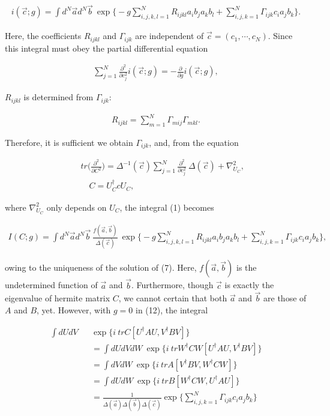 \documentclass[a4paper,12pt]{article}
\begin{document}
\begin{eqnarray}
	i(\vec{c};g)=\int d^N\vec{a} d^N\vec{b} \> \exp \Big\{ 
	-g\sum_{i,j,k,l=1}^N R_{ijkl} a_ib_ja_kb_l +\sum_{i,j,k=1}^N 
	\Gamma_{ijk} c_ia_jb_k \Big\}.
\end{eqnarray}

\noindent Here, the coefficients $R_{ijkl}$ and $\Gamma_{ijk}$ are independent of $\vec{c}\! =\! (c_1,\cdots ,c_N)$. Since this integral must obey the partial differential equation 

\begin{eqnarray}
	\sum_{j=1}^N \frac{\partial^2}{\partial c_j^2} i(\vec{c};g)
	=-\frac{\partial}{\partial g} i(\vec{c};g),
\end{eqnarray}

\noindent $R_{ijkl}$ is determined from $\Gamma_{ijk}$: 

\begin{eqnarray}
	R_{ijkl}=\sum_{m=1}^N \Gamma_{mij}\Gamma_{mkl}.
\end{eqnarray}

\noindent Therefore, it is sufficient we obtain $\Gamma_{ijk}$, and, from the equation 

\begin{eqnarray}
	& & tr\Big( \frac{\partial^2}{\partial C^2}\Big)=\Delta^{-1}(\vec{c})
	\sum_{j=1}^N\frac{\partial^2}{\partial c_j^2}\> \Delta (\vec{c})
	+\nabla_{U_C}^2, \\
	& & \quad C=U_C^{\dagger}cU_C, \nonumber
\end{eqnarray}

\noindent where $\nabla_{U_C}^2$ only depends on $U_C$, the integral (1) becomes 

\begin{eqnarray}
	I(C;g)=\int d^N\vec{a} d^N\vec{b} \> 
	\frac{f(\vec{a},\vec{b})}{\Delta(\vec{c})} \> \exp \Big\{ 
	-g\sum_{i,j,k,l=1}^N R_{ijkl} a_ib_ja_kb_l +\sum_{i,j,k=1}^N 
	\Gamma_{ijk} c_ia_jb_k \Big\},
\end{eqnarray}

\noindent owing to the uniqueness of the solution of (7). Here, $f(\vec{a},\vec{b})$ is the undetermined function of $\vec{a}$ and $\vec{b}$. Furthermore, though $\vec{c}$ is exactly the eigenvalue of hermite matrix $C$, we cannot certain that both $\vec{a}$ and $\vec{b}$ are those of $A$ and $B$, yet. However, with $g\! =\! 0$ in (12), the integral 

\begin{eqnarray}
	\int dUdV \! \! \! \! \! \! \! \! & & \exp \Big\{ i\> 
	trC[U^{\dagger}AU,V^{\dagger}BV] \Big\} \nonumber \\
	& & = \int dUdVdW \> \exp \Big\{ i\> trW^{\dagger}CW[U^{\dagger}AU,
	V^{\dagger}BV] \Big\} \nonumber \\
	& & = \int dVdW \> \exp \Big\{ i\> trA[V^{\dagger}BV,
	W^{\dagger}CW] \Big\} \nonumber \\
	& & = \int dUdW \> \exp \Big\{ i\> trB[W^{\dagger}CW,
	U^{\dagger}AU] \Big\} \nonumber \\
	& & = \frac{1}{\Delta (\vec{a})\Delta (\vec{b})\Delta (\vec{c})}\exp 
	\Big\{ \sum_{i,j,k=1}^N \Gamma_{ijk} c_ia_jb_k \Big\}
\end{eqnarray}
\end{document}
